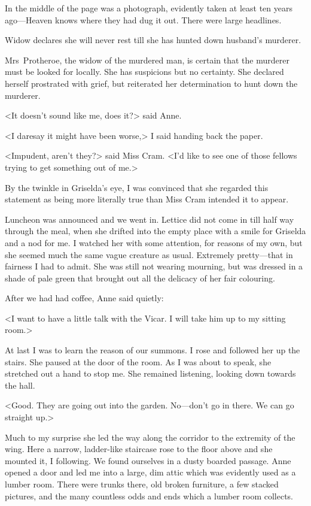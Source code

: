 In the middle of the page was a photograph, evidently taken at least ten years ago—Heaven knows where they had dug it out. There were large headlines.

\begin{newspaper}{Widow declares she will never rest till she has hunted down husband's murderer.}

Mrs~Protheroe, the widow of the murdered man, is certain that the murderer must be looked for locally. She has suspicions but no certainty. She declared herself prostrated with grief, but reiterated her determination to hunt down the murderer.
\end{newspaper}

<It doesn't sound like me, does it?> said Anne.

<I daresay it might have been worse,> I said handing back the paper.

<Impudent, aren't they?> said Miss Cram. <I'd like to see one of those fellows trying to get something out of me.>

By the twinkle in Griselda's eye, I was convinced that she regarded this statement as being more literally true than Miss Cram intended it to appear.

Luncheon was announced and we went in. Lettice did not come in till half way through the meal, when she drifted into the empty place with a smile for Griselda and a nod for me. I watched her with some attention, for reasons of my own, but she seemed much the same vague creature as usual. Extremely pretty—that in fairness I had to admit. She was still not wearing mourning, but was dressed in a shade of pale green that brought out all the delicacy of her fair colouring.

After we had had coffee, Anne said quietly:

<I want to have a little talk with the Vicar. I will take him up to my sitting room.>

At last I was to learn the reason of our summons. I rose and followed her up the stairs. She paused at the door of the room. As I was about to speak, she stretched out a hand to stop me. She remained listening, looking down towards the hall.

<Good. They are going out into the garden. No—don't go in there. We can go straight up.>

Much to my surprise she led the way along the corridor to the extremity of the wing. Here a narrow, ladder-like staircase rose to the floor above and she mounted it, I following. We found ourselves in a dusty boarded passage. Anne opened a door and led me into a large, dim attic which was evidently used as a lumber room. There were trunks there, old broken furniture, a few stacked pictures, and the many countless odds and ends which a lumber room collects.

